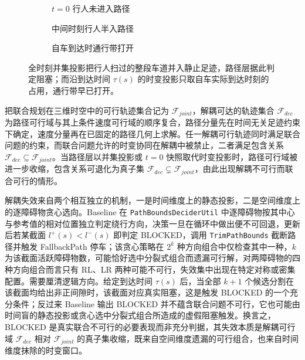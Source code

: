 \documentclass[a4paper,zihao=5]{ctexart}
\theoremstyle{definition}
\begin{document}
\begin{figure}[htbp]
\centering
\begin{subfigure}[b]{0.30\textwidth}
  \centering
  \caption{$t{=}0$ 行人未进入路径}
\end{subfigure}\hfill
\begin{subfigure}[b]{0.30\textwidth}
  \centering
  \caption{中间时刻行人半入路径}
\end{subfigure}\hfill
\begin{subfigure}[b]{0.30\textwidth}
  \centering
  \caption{自车到达时通行带打开}
\end{subfigure}
\caption{横穿行人场景下的时间盲信息断裂}
\caption*{全时刻并集投影把行人扫过的整段车道并入静止足迹，路径层据此判定阻塞；而沿到达时间 $\tau(s)$ 的时变投影只取自车实际到达时刻的占用，通行带早已打开。}
\label{fig:dynamic_exclusion}
\end{figure}

把联合规划在三维时空中的可行轨迹集合记为 $\mathcal{F}_{joint}$，解耦可达的轨迹集合 $\mathcal{F}_{dec}$ 为路径可行域与其上条件速度可行域的顺序复合，路径分量先在时间无关足迹约束下确定，速度分量再在已固定的路径几何上求解。任一解耦可行轨迹同时满足联合问题的约束，而联合问题允许的时变协同在解耦中被禁止，二者满足包含关系 $\mathcal{F}_{dec} \subseteq \mathcal{F}_{joint}$。当路径层以并集投影或 $t{=}0$ 快照取代时变投影时，路径可行域被进一步收缩，包含关系可退化为真子集 $\mathcal{F}_{dec} \subsetneq \mathcal{F}_{joint}$，由此出现解耦不可行而联合可行的情形。

解耦失效来自两个相互独立的机制，一是时间维度上的静态投影，二是空间维度上的逐障碍物贪心选向。Baseline 在 \texttt{PathBoundsDeciderUtil} 中逐障碍物按其中心与参考值的相对位置独立判定绕行方向，决策一旦在循环中做出便不可回退，更新后若某截面 $l^{+}(s) < l^{-}(s)$ 即判定 BLOCKED，调用 \texttt{TrimPathBounds} 截断路径并触发 FallbackPath 停车；该贪心策略在 $2^k$ 种方向组合中仅检查其中一种，$k$ 为该截面活跃障碍物数，可能恰好选中分裂式组合而遗漏可行解，对两障碍物的四种方向组合而言只有 RL、LR 两种可能不可行，失效集中出现在特定对称或密集配置。需要厘清逻辑方向。给定到达时间 $\tau(s)$ 后，当全部 $k+1$ 个候选分割在该截面均给出非正间隙时，该截面对应真实阻塞，这是触发 BLOCKED 的一个充分条件；反过来 Baseline 输出 BLOCKED 并不蕴含联合问题不可行，它也可能由时间盲的静态投影或贪心选中分裂式组合所造成的虚假阻塞触发。换言之，BLOCKED 是真实联合不可行的必要表现而非充分判据，其失效本质是解耦可行域 $\mathcal{F}_{dec}$ 相对 $\mathcal{F}_{joint}$ 的真子集收缩，既来自空间维度遗漏的可行组合，也来自时间维度抹除的时变窗口。
\end{document}
